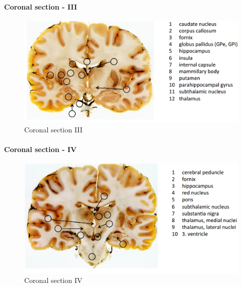 \documentclass[12pt,article,oneside,a4paper]{memoir}
\begin{document}
\paragraph{Coronal section - III}
\begin{figure}[H]
	\centering
  	\includegraphics[width=\linewidth]{imgs/coronal-section-III.png}
	\caption{Coronal section III}
  	\label{fig:coronalSectionI}
\end{figure}

\paragraph{Coronal section - IV}
\begin{figure}[H]
	\centering
  	\includegraphics[width=\linewidth]{imgs/coronal-section-IV.png}
	\caption{Coronal section IV}
  	\label{fig:coronalSectionI}
\end{figure}
\end{document}
